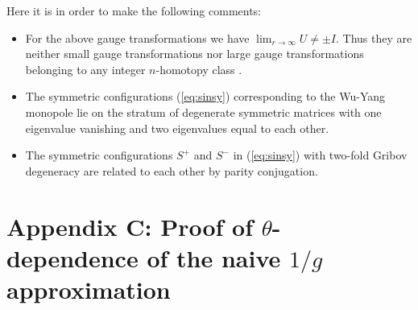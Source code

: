 \documentclass[a4paper,12pt]{article}
\begin{document}
Here it is in order to make the following comments:
\begin{itemize}
\item
For the above gauge transformations we have $\lim_{r\to \infty}U \neq \pm I$.
Thus they are neither small gauge transformations nor
large gauge transformations belonging to any integer $n$-homotopy class
\cite{Jackiw}.
\item
The symmetric configurations (\ref{eq:sinsy}) corresponding to the
Wu-Yang monopole lie on the stratum of degenerate symmetric matrices
with one eigenvalue vanishing and two eigenvalues equal to each other.
\item
The symmetric configurations $S^+$ and $S^-$ in (\ref{eq:sinsy})
with two-fold Gribov degeneracy
are related to each other by parity conjugation.
\end{itemize}



\section*{Appendix C: Proof of
$\theta$-dependence of the naive $1/g$ approximation }

\label{ap:C}
\end{document}
